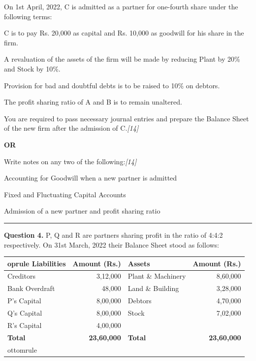 \documentclass[11pt,a4paper]{article}
\newcommand{\pts}[1]{\hfill   \textit{[#1]}}
\begin{document}
On 1st April, 2022, C is admitted as a partner for one-fourth share under the following terms:

\begin{parts}
  \item C is to pay Rs. 20,000 as capital and Rs. 10,000 as goodwill for his share in the firm.
  \item A revaluation of the assets of the firm will be made by reducing Plant by 20\% and Stock by 10\%.
  \item Provision for bad and doubtful debts is to be raised to 10\% on debtors.
  \item The profit sharing ratio of A and B is to remain unaltered.
\end{parts}
You are required to pass necessary journal entries and prepare the Balance Sheet of the new firm after the admission of C.\pts{14}

\centerline{   \textbf{OR}}

Write notes on any two of the following:\pts{14}

\begin{parts}
  \item Accounting for Goodwill when a new partner is admitted
  \item Fixed and Fluctuating Capital Accounts
  \item Admission of a new partner and profit sharing ratio
\end{parts}

\medskip\rule{\linewidth}{0.2pt}


\newpage




\noindent   \textbf{Question 4.}
P, Q and R are partners sharing profit in the ratio of 4:4:2 respectively. On 31st March, 2022 their Balance Sheet stood as follows:

\begin{center}
  \small
  
\begin{tabular}{lr|lr}
     oprule
   \textbf{Liabilities} &   \textbf{Amount (Rs.)} &   \textbf{Assets} &   \textbf{Amount (Rs.)} \\
    \midrule
    Creditors & 3,12,000 & Plant \& Machinery & 8,60,000 \\
    Bank Overdraft & 48,000 & Land \& Building & 3,28,000 \\
    P's Capital & 8,00,000 & Debtors & 4,70,000 \\
    Q's Capital & 8,00,000 & Stock & 7,02,000 \\
    R's Capital & 4,00,000 & & \\
    \midrule
   \textbf{Total} &   \textbf{23,60,000} &   \textbf{Total} &   \textbf{23,60,000} \\
    ottomrule
  \end{tabular}
\end{center}
\end{document}
